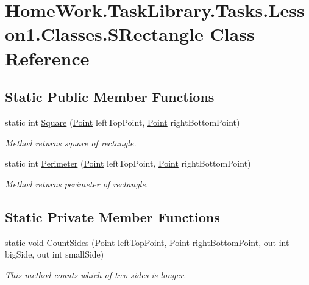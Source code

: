 \hypertarget{class_home_work_1_1_task_library_1_1_tasks_1_1_lesson1_1_1_classes_1_1_s_rectangle}{}\section{Home\+Work.\+Task\+Library.\+Tasks.\+Lesson1.\+Classes.\+S\+Rectangle Class Reference}
\label{class_home_work_1_1_task_library_1_1_tasks_1_1_lesson1_1_1_classes_1_1_s_rectangle}
\subsection*{Static Public Member Functions}
\begin{DoxyCompactItemize}
\item 
static int \mbox{\hyperlink{class_home_work_1_1_task_library_1_1_tasks_1_1_lesson1_1_1_classes_1_1_s_rectangle_a5282ae8caf8c2698cc5a325974d99d4a}{Square}} (\mbox{\hyperlink{struct_home_work_1_1_task_library_1_1_tasks_1_1_lesson1_1_1_classes_1_1_point}{Point}} left\+Top\+Point, \mbox{\hyperlink{struct_home_work_1_1_task_library_1_1_tasks_1_1_lesson1_1_1_classes_1_1_point}{Point}} right\+Bottom\+Point)
\begin{DoxyCompactList}\small\item\em Method returns square of rectangle. \end{DoxyCompactList}\item 
static int \mbox{\hyperlink{class_home_work_1_1_task_library_1_1_tasks_1_1_lesson1_1_1_classes_1_1_s_rectangle_a892d85f7c500fa374fbfce7af15dd9cc}{Perimeter}} (\mbox{\hyperlink{struct_home_work_1_1_task_library_1_1_tasks_1_1_lesson1_1_1_classes_1_1_point}{Point}} left\+Top\+Point, \mbox{\hyperlink{struct_home_work_1_1_task_library_1_1_tasks_1_1_lesson1_1_1_classes_1_1_point}{Point}} right\+Bottom\+Point)
\begin{DoxyCompactList}\small\item\em Method returns perimeter of rectangle. \end{DoxyCompactList}\end{DoxyCompactItemize}
\subsection*{Static Private Member Functions}
\begin{DoxyCompactItemize}
\item 
static void \mbox{\hyperlink{class_home_work_1_1_task_library_1_1_tasks_1_1_lesson1_1_1_classes_1_1_s_rectangle_acdefe7c2fc282e989ef367a37ec73ecb}{Count\+Sides}} (\mbox{\hyperlink{struct_home_work_1_1_task_library_1_1_tasks_1_1_lesson1_1_1_classes_1_1_point}{Point}} left\+Top\+Point, \mbox{\hyperlink{struct_home_work_1_1_task_library_1_1_tasks_1_1_lesson1_1_1_classes_1_1_point}{Point}} right\+Bottom\+Point, out int big\+Side, out int small\+Side)
\begin{DoxyCompactList}\small\item\em This method counts which of two sides is longer. \end{DoxyCompactList}\end{DoxyCompactItemize}


